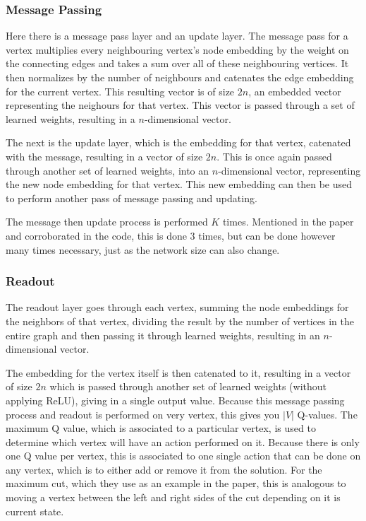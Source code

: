 \documentclass{article}
\begin{document}
\subsubsection{Message Passing}\label{sec:message-passing}

Here there is a message pass layer and an update layer. The message pass for a vertex multiplies every neighbouring vertex's node embedding by the weight on the connecting edges and takes a sum over all of these neighbouring vertices. It then normalizes by the number of neighbours and catenates the edge embedding for the current vertex. This resulting vector is of size $2n$, an embedded vector representing the neighours for that vertex. This vector is passed through a set of learned weights, resulting in a $n$-dimensional vector. 

The next is the update layer, which is the embedding for that vertex, catenated with the message, resulting in a vector of size $2n$. This is once again passed through another set of learned weights, into an $n$-dimensional vector, representing the new node embedding for that vertex. This new embedding can then be used to perform another pass of message passing and updating.

The message then update process is performed $K$ times. Mentioned in the paper and corroborated in the code, this is done 3 times, but can be done however many times necessary, just as the network size can also change.

\subsubsection{Readout}\label{sec:readout-layer}

The readout layer goes through each vertex, summing the node embeddings for the neighbors of that vertex, dividing the result by the number of vertices in the entire graph and then passing it through learned weights, resulting in an $n$-dimensional vector.

The embedding for the vertex itself is then catenated to it, resulting in a vector of size $2n$ which is passed through another set of learned weights (without applying ReLU), giving in a single output value. Because this message passing process and readout is performed on very vertex, this gives you $|V|$ Q-values. The maximum Q value, which is associated to a particular vertex, is used to determine which vertex will have an action performed on it. Because there is only one Q value per vertex, this is associated to one single action that can be done on any vertex, which is to either add or remove it from the solution. For the maximum cut, which they use as an example in the paper, this is analogous to moving a vertex between the left and right sides of the cut depending on it is current state. 
\end{document}
